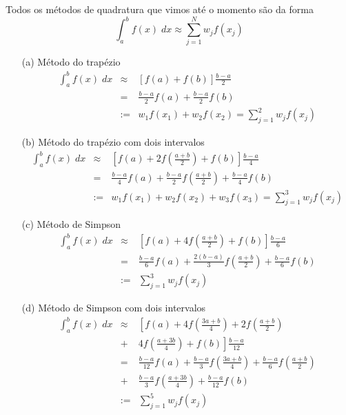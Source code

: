 Todos os métodos de quadratura que vimos até o momento são da forma
$$\int_a^b f(x)\;dx \approx \sum_{j=1}^N w_j f(x_j)$$
\begin{ex}
\begin{itemize}
\item[(a)] Método do trapézio
\begin{eqnarray*}
\int_a^b f(x)\;dx &\approx& \left[f(a)+f(b)\right]\frac{b-a}{2}\\
&=&\frac{b-a}{2}f(a)+\frac{b-a}{2}f(b)\\
&:=&w_1f(x_1)+w_2f(x_2)= \sum_{j=1}^2 w_j f(x_j)
\end{eqnarray*}

\item[(b)] Método do trapézio com dois intervalos
\begin{eqnarray*}
\int_a^b f(x)\;dx &\approx& \left[f(a)+2f\left(\frac{a+b}{2}\right)+f(b)\right]\frac{b-a}{4}\\
&=&\frac{b-a}{4}f(a)+\frac{b-a}{2}f\left(\frac{a+b}{2}\right)+\frac{b-a}{4}f(b)\\
&:=&w_1f(x_1)+w_2f(x_2)+w_3f(x_3)= \sum_{j=1}^3 w_j f(x_j)
\end{eqnarray*}

\item[(c)] Método de Simpson
\begin{eqnarray*}
\int_a^b f(x)\;dx &\approx& \left[f(a)+4f\left(\frac{a+b}{2}\right)+f(b)\right]\frac{b-a}{6}\\
&=&\frac{b-a}{6}f(a)+\frac{2(b-a)}{3}f\left(\frac{a+b}{2}\right)+\frac{b-a}{6}f(b)\\
&:=&\sum_{j=1}^3 w_j f(x_j)
\end{eqnarray*}

\item[(d)] Método de Simpson com dois intervalos
\begin{eqnarray*}
\int_a^b f(x)\;dx &\approx& \left[f(a)+4f\left(\frac{3a+b}{4}\right)+2f\left(\frac{a+b}{2}\right)\right.\\
&+& \left. 4f\left(\frac{a+3b}{4}\right)+f(b)\right]\frac{b-a}{12}\\
&=&\frac{b-a}{12}f(a)+\frac{b-a}{3}f\left(\frac{3a+b}{4}\right)+\frac{b-a}{6}f\left(\frac{a+b}{2}\right)\\
&+&\frac{b-a}{3}f\left(\frac{a+3b}{4}\right)+\frac{b-a}{12}f(b)\\
&:=&\sum_{j=1}^5 w_j f(x_j)
\end{eqnarray*}

\end{itemize}
\end{ex}

